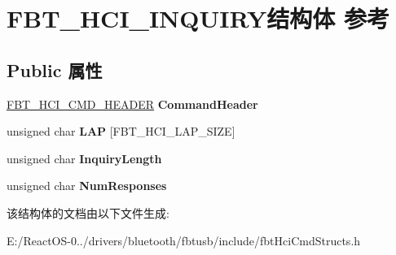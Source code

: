 \hypertarget{struct_f_b_t___h_c_i___i_n_q_u_i_r_y}{}\section{F\+B\+T\+\_\+\+H\+C\+I\+\_\+\+I\+N\+Q\+U\+I\+R\+Y结构体 参考}
\label{struct_f_b_t___h_c_i___i_n_q_u_i_r_y}
\subsection*{Public 属性}
\begin{DoxyCompactItemize}
\item 
\mbox{\label{struct_f_b_t___h_c_i___i_n_q_u_i_r_y_a042563207d87fc05a6bb84330aba00b0}} 
\hyperlink{struct_f_b_t___h_c_i___c_m_d___h_e_a_d_e_r}{F\+B\+T\+\_\+\+H\+C\+I\+\_\+\+C\+M\+D\+\_\+\+H\+E\+A\+D\+ER} {\bfseries Command\+Header}
\item 
\mbox{\label{struct_f_b_t___h_c_i___i_n_q_u_i_r_y_af23589f8cab28d48f6ea9393f607f870}} 
unsigned char {\bfseries L\+AP} \mbox{[}F\+B\+T\+\_\+\+H\+C\+I\+\_\+\+L\+A\+P\+\_\+\+S\+I\+ZE\mbox{]}
\item 
\mbox{\label{struct_f_b_t___h_c_i___i_n_q_u_i_r_y_ae4594259b6e352b1e4a8c848986354c3}} 
unsigned char {\bfseries Inquiry\+Length}
\item 
\mbox{\label{struct_f_b_t___h_c_i___i_n_q_u_i_r_y_a9d9c6486bcfd5d9a9d6af7f3f2aa5af4}} 
unsigned char {\bfseries Num\+Responses}
\end{DoxyCompactItemize}


该结构体的文档由以下文件生成\+:\begin{DoxyCompactItemize}
\item 
E\+:/\+React\+O\+S-\/0../drivers/bluetooth/fbtusb/include/fbt\+Hci\+Cmd\+Structs.\+h\end{DoxyCompactItemize}
